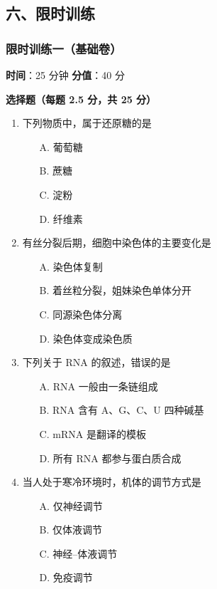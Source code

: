 \subsection{六、限时训练}

\subsubsection{限时训练一（基础卷）}

\textbf{时间}：25 分钟 \quad \textbf{分值}：40 分

\textbf{选择题（每题 2.5 分，共 25 分）}

\begin{enumerate}
  \item 下列物质中，属于还原糖的是
  \begin{enumerate}
    \item[A.] 葡萄糖
    \item[B.] 蔗糖
    \item[C.] 淀粉
    \item[D.] 纤维素
  \end{enumerate}

  \item 有丝分裂后期，细胞中染色体的主要变化是
  \begin{enumerate}
    \item[A.] 染色体复制
    \item[B.] 着丝粒分裂，姐妹染色单体分开
    \item[C.] 同源染色体分离
    \item[D.] 染色体变成染色质
  \end{enumerate}

  \item 下列关于 RNA 的叙述，错误的是
  \begin{enumerate}
    \item[A.] RNA 一般由一条链组成
    \item[B.] RNA 含有 A、G、C、U 四种碱基
    \item[C.] mRNA 是翻译的模板
    \item[D.] 所有 RNA 都参与蛋白质合成
  \end{enumerate}

  \item 当人处于寒冷环境时，机体的调节方式是
  \begin{enumerate}
    \item[A.] 仅神经调节
    \item[B.] 仅体液调节
    \item[C.] 神经--体液调节
    \item[D.] 免疫调节
  \end{enumerate}


\end{enumerate}
